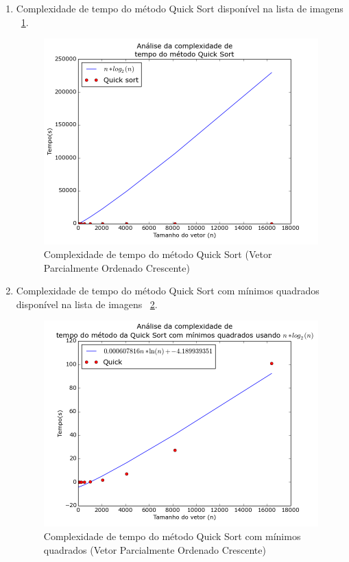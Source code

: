 \documentclass[12pt,a4paper,twoside]{report}
\begin{document}
		
						
		\begin{enumerate}

								\item Complexidade de tempo do método Quick Sort disponível na lista de imagens ~\ref{fig:QuickPlot2POC}.
								\begin{figure}[!h]
									\centering
									\includegraphics[scale=0.6]{../imagens/Quick/Quick_plot_2_parcialmente_ordenado_crescente.png}
									\caption{Complexidade de tempo do método Quick Sort (Vetor Parcialmente Ordenado Crescente) \label{fig:QuickPlot2POC}}
								\end{figure}


								\item Complexidade de tempo do método Quick Sort com mínimos quadrados disponível na lista de imagens  ~\ref{fig:QuickPlot3POC}.
								\begin{figure}[!h]
									\centering
									\includegraphics[scale=0.6]{../imagens/Quick/Quick_plot_3_parcialmente_ordenado_crescente.png}
									\caption{Complexidade de tempo do método Quick Sort com mínimos quadrados (Vetor Parcialmente Ordenado Crescente) \label{fig:QuickPlot3POC}}
								\end{figure}

							\end{enumerate}
\end{document}
